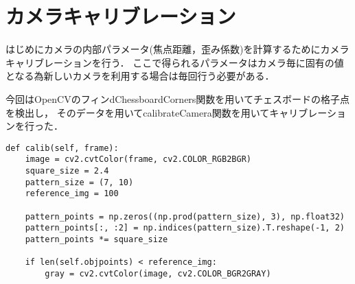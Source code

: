 \section{カメラキャリブレーション}
\label{calib}

はじめにカメラの内部パラメータ(焦点距離，歪み係数)を計算するためにカメラキャリブレーションを行う．
ここで得られるパラメータはカメラ毎に固有の値となる為新しいカメラを利用する場合は毎回行う必要がある．

今回はOpenCVのフィンdChessboardCorners関数を用いてチェスボードの格子点を検出し，
そのデータを用いてcalibrateCamera関数を用いてキャリブレーションを行った．

\begin{lstlisting}[caption=calibration code,label=calib_code]
def calib(self, frame):                                                                                                                                      
    image = cv2.cvtColor(frame, cv2.COLOR_RGB2BGR)                                                                                                           
    square_size = 2.4                                                                                                                                        
    pattern_size = (7, 10)                                                                                                                                   
    reference_img = 100                                                                                                                                      
                                                                                                                                                            
    pattern_points = np.zeros((np.prod(pattern_size), 3), np.float32)                                                                                        
    pattern_points[:, :2] = np.indices(pattern_size).T.reshape(-1, 2)                                                                                        
    pattern_points *= square_size                                                                                                                            
                                                                                                                                                            
    if len(self.objpoints) < reference_img:                                                                                                                  
        gray = cv2.cvtColor(image, cv2.COLOR_BGR2GRAY)                                                                                                       
                                                                                                                                                            

\end{lstlisting}
